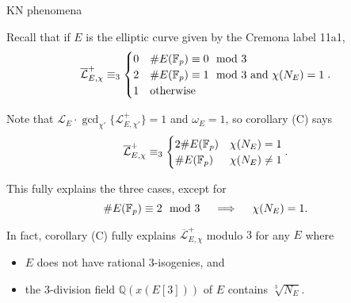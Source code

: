 \documentclass[10pt]{beamer}
\begin{document}
\begin{frame}[t]{KN phenomena}

Recall that if $ E $ is the elliptic curve given by the Cremona label 11a1,
\vspace{-0.2cm} $$ \vspace{-0.2cm} \overline{\mathcal{L}}_{E, \chi}^+ \equiv_3
\begin{cases}
0 & \#E(\mathbb{F}_p) \equiv 0 \mod 3 \\
2 & \#E(\mathbb{F}_p) \equiv 1 \mod 3 \ \text{and} \ \chi(N_E) = 1 \\
1 & \text{otherwise}
\end{cases}.
$$

\pause

Note that $ \mathcal{L}_E \cdot \gcd_{\chi'}\{\mathcal{L}_{E, \chi'}^+\} = 1 $ and $ \omega_E = 1 $, so corollary (C) says
\vspace{-0.2cm} $$ \vspace{-0.2cm} \overline{\mathcal{L}}_{E, \chi}^+ \equiv_3
\begin{cases}
2\#E(\mathbb{F}_p) & \chi(N_E) = 1 \\
\#E(\mathbb{F}_p) & \chi(N_E) \ne 1
\end{cases}.
$$

\pause

This fully explains the three cases, except for
\vspace{-0.2cm} $$ \vspace{-0.2cm} \#E(\mathbb{F}_p) \equiv 2 \mod 3 \quad \implies \quad \chi(N_E) = 1. $$

\pause

\vspace{0.5cm} In fact, corollary (C) fully explains $ \overline{\mathcal{L}}_{E, \chi}^+ $ modulo $ 3 $ for any $ E $ where
\begin{itemize}
\item $ E $ does not have rational $ 3 $-isogenies, and
\item the $ 3 $-division field $ \mathbb{Q}(x(E[3])) $ of $ E $ contains $ \sqrt[3]{N_E} $.
\end{itemize}

\end{frame}
\end{document}
